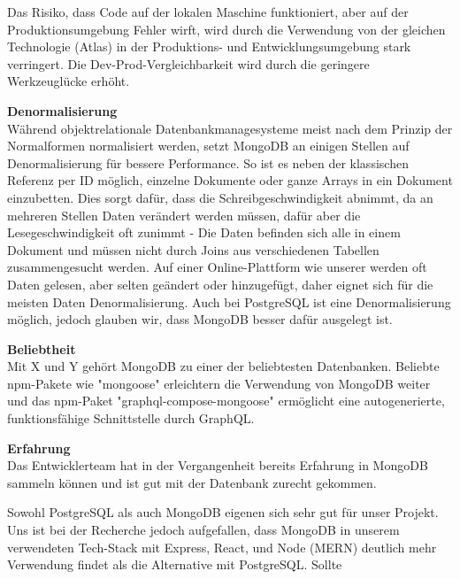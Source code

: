 Das Risiko, dass Code auf der lokalen Maschine funktioniert, aber auf der Produktionsumgebung Fehler wirft, wird durch die Verwendung von der gleichen Technologie (Atlas) in der Produktions- und Entwicklungsumgebung stark verringert. Die Dev-Prod-Vergleichbarkeit wird durch die geringere Werkzeuglücke erhöht. \cite{12FA1}



\textbf{Denormalisierung}\\
Während objektrelationale Datenbankmanagesysteme meist nach dem Prinzip der Normalformen normalisiert werden, setzt MongoDB an einigen Stellen auf Denormalisierung für bessere Performance. So ist es neben der klassischen Referenz per ID möglich, einzelne Dokumente oder ganze Arrays in ein Dokument einzubetten. Dies sorgt dafür, dass die Schreibgeschwindigkeit abnimmt, da an mehreren Stellen Daten verändert werden müssen, dafür aber die Lesegeschwindigkeit oft zunimmt - Die Daten befinden sich alle in einem Dokument und müssen nicht durch Joins aus verschiedenen Tabellen zusammengesucht werden.
Auf einer Online-Plattform wie unserer werden oft Daten gelesen, aber selten geändert oder hinzugefügt, daher eignet sich für die meisten Daten Denormalisierung.
Auch bei PostgreSQL ist eine Denormalisierung möglich, jedoch glauben wir, dass MongoDB besser dafür ausgelegt ist.

\textbf{Beliebtheit}\\
Mit X und Y gehört MongoDB zu einer der beliebtesten Datenbanken. Beliebte npm-Pakete wie "mongoose" erleichtern die Verwendung von MongoDB weiter und das npm-Paket "graphql-compose-mongoose" ermöglicht eine autogenerierte, funktionsfähige Schnittstelle durch GraphQL.

\textbf{Erfahrung}\\
Das Entwicklerteam hat in der Vergangenheit bereits Erfahrung in MongoDB sammeln können und ist gut mit der Datenbank zurecht gekommen. 

Sowohl PostgreSQL als auch MongoDB eigenen sich sehr gut für unser Projekt. Uns ist bei der Recherche jedoch aufgefallen, dass MongoDB in unserem verwendeten Tech-Stack mit Express, React, und Node (MERN) deutlich mehr Verwendung findet als die Alternative mit PostgreSQL. Sollte




